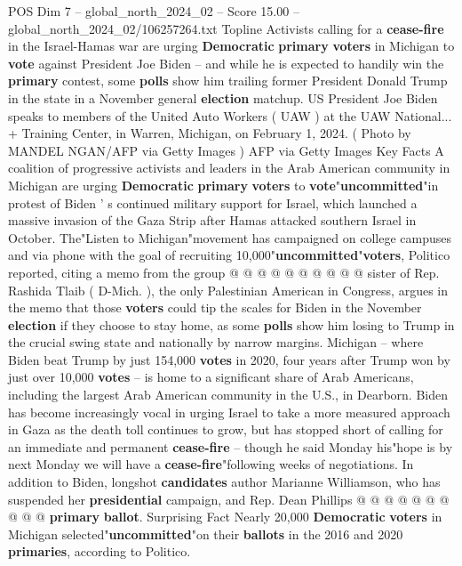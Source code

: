 \begin{textsample}{POS Dim 7 – global\_north\_2024\_02 – Score 15.00 – global\_north\_2024\_02/106257264.txt}  \label{ex:f7_pos_024}
Topline Activists calling for a \textbf{cease-fire} in the Israel-Hamas war are urging \textbf{Democratic} \textbf{primary} \textbf{voters} in Michigan to \textbf{vote} against President Joe Biden -- and while he is expected to handily win the \textbf{primary} contest, some \textbf{polls} show him trailing former President Donald Trump in the state in a November general \textbf{election} matchup.
US President Joe Biden speaks to members of the United Auto Workers ( UAW ) at the UAW National... + Training Center, in Warren, Michigan, on February 1, 2024. ( Photo by MANDEL NGAN/AFP via Getty Images ) AFP via Getty Images Key Facts A coalition of progressive activists and leaders in the Arab American community in Michigan are urging \textbf{Democratic} \textbf{primary} \textbf{voters} to \textbf{vote}"\textbf{uncommitted}"in protest of Biden ' s continued military support for Israel, which launched a massive invasion of the Gaza Strip after Hamas attacked southern Israel in October.
The"Listen to Michigan"movement has campaigned on college campuses and via phone with the goal of recruiting 10,000"\textbf{uncommitted}"\textbf{voters}, Politico reported, citing a memo from the group @ @ @ @ @ @ @ @ @ @ sister of Rep.
Rashida Tlaib ( D-Mich. ), the only Palestinian American in Congress, argues in the memo that those \textbf{voters} could tip the scales for Biden in the November \textbf{election} if they choose to stay home, as some \textbf{polls} show him losing to Trump in the crucial swing state and nationally by narrow margins.
Michigan -- where Biden beat Trump by just 154,000 \textbf{votes} in 2020, four years after Trump won by just over 10,000 \textbf{votes} -- is home to a significant share of Arab Americans, including the largest Arab American community in the U.S., in Dearborn.
Biden has become increasingly vocal in urging Israel to take a more measured approach in Gaza as the death toll continues to grow, but has stopped short of calling for an immediate and permanent \textbf{cease-fire} -- though he said Monday his"hope is by next Monday we will have a \textbf{cease-fire}"following weeks of negotiations.
In addition to Biden, longshot \textbf{candidates} author Marianne Williamson, who has suspended her \textbf{presidential} campaign, and Rep.
Dean Phillips @ @ @ @ @ @ @ @ @ @ \textbf{primary} \textbf{ballot}.
Surprising Fact Nearly 20,000 \textbf{Democratic} \textbf{voters} in Michigan selected"\textbf{uncommitted}"on their \textbf{ballots} in the 2016 and 2020 \textbf{primaries}, according to Politico.

\end{textsample}
